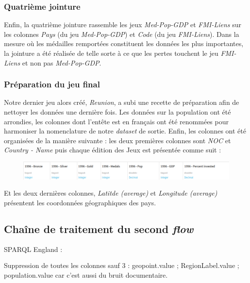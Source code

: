 \documentclass[hidelinks, 12pt]{article}
\begin{document}
\subsubsection{Quatrième jointure}

Enfin, la quatrième jointure rassemble les jeux \emph{Med-Pop-GDP} et \emph{FMI-Liens} sur les colonnes \emph{Pays} (du jeu \emph{Med-Pop-GDP}) et \emph{Code} (du jeu \emph{FMI-Liens}). Dans la mesure où les médailles remportées constituent les données les plus importantes, la jointure a été réalisée de telle sorte à ce que les pertes touchent le jeu \emph{FMI-Liens} et non pas \emph{Med-Pop-GDP}.

\subsubsection{Préparation du jeu final}

Notre dernier jeu alors créé, \emph{Reunion}, a subi une recette de préparation afin de nettoyer les données une dernière fois. Les données sur la population ont été arrondies, les colonnes dont l'entête est en français ont été renommées pour harmoniser la nomenclature de notre \emph{dataset} de sortie. Enfin, les colonnes ont été organisées de la manière suivante : les deux premières colonnes sont \emph{NOC} et \emph{Country - Name} puis chaque édition des Jeux est présentée comme suit :

\begin{center}
	\begin{figure}[H]
		\includegraphics[scale=0.4]{tableaufinal.png}
	\end{figure}
\end{center}


Et les deux dernières colonnes, \emph{Latitde (average)} et \emph{Longitude (average)} présentent les coordonnées géographiques des pays.


\subsection{Chaîne de traitement du second \emph{flow}}

SPARQL England :

Suppression de toutes les colonnes sauf 3 : geopoint.value ; RegionLabel.value ; population.value car c'est aussi du bruit documentaire.
\end{document}
